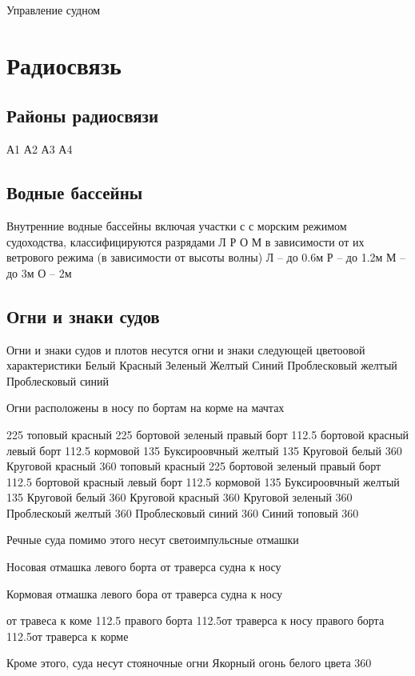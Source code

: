 \documentclass{article}        %
\begin{document}
Управление судном

\section{Радиосвязь}

\subsection{Районы радиосвязи}
А1
А2
А3
А4
\subsection{Водные бассейны}
Внутренние водные бассейны включая участки с с морским режимом судоходства, классифицируются разрядами 
Л Р О М в зависимости от их ветрового режима (в зависимости от высоты волны)
Л -- до 0.6м
Р -- до 1.2м
М -- до 3м
О -- 2м

\subsection{Огни и знаки судов}
Огни и знаки судов и плотов несутся огни и знаки следующей цветоовой характеристики
Белый
Красный
Зеленый
Желтый
Синий
Проблесковый желтый
Проблесковый синий

Огни расположены
в носу
по бортам
на корме
на мачтах


225\degree
топовый красный
225\degree
бортовой зеленый правый борт 112.5\degree
бортовой красный левый борт 112.5\degree
кормовой 135\degree
Буксироовчный желтый 135\degree
Круговой белый 360\degree
Круговой красный 360\degree
топовый красный
225\degree
бортовой зеленый правый борт 112.5\degree
бортовой красный левый борт 112.5\degree
кормовой 135\degree
Буксироовчный желтый 135\degree
Круговой белый 360\degree
Круговой красный 360\degree
Круговой зеленый 360\degree
Проблескоый желтый 360\degree
Проблесковый синий 360\degree
Синий топовый 360\degree

Речные суда помимо этого несут светоимпульсные отмашки

Носовая отмашка левого борта от траверса судна к носу

Кормовая отмашка левого бора от траверса судна к носу

от травеса к коме 112.5\degree
правого борта 112.5\degree от траверса к носу
правого борта 112.5\degree от траверса к корме

Кроме этого, суда несут стояночные огни
Якорный огонь белого цвета 360\degree
\end{document}
